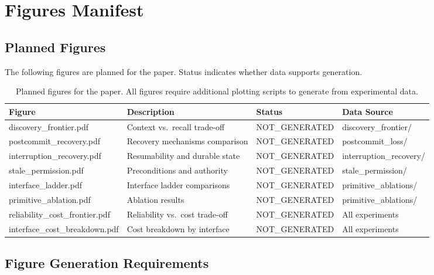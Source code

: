 
\section{Figures Manifest}

\subsection{Planned Figures}

The following figures are planned for the paper. Status indicates whether data supports generation.

\begin{table}[h]
\centering
\begin{tabular}{llll}
\hline
\textbf{Figure} & \textbf{Description} & \textbf{Status} & \textbf{Data Source} \\
\hline
discovery\_frontier.pdf & Context vs.\ recall trade-off & NOT\_GENERATED & discovery\_frontier/ \\
postcommit\_recovery.pdf & Recovery mechanisms comparison & NOT\_GENERATED & postcommit\_loss/ \\
interruption\_recovery.pdf & Resumability and durable state & NOT\_GENERATED & interruption\_recovery/ \\
stale\_permission.pdf & Preconditions and authority & NOT\_GENERATED & stale\_permission/ \\
interface\_ladder.pdf & Interface ladder comparisons & NOT\_GENERATED & primitive\_ablations/ \\
primitive\_ablation.pdf & Ablation results & NOT\_GENERATED & primitive\_ablations/ \\
reliability\_cost\_frontier.pdf & Reliability vs.\ cost trade-off & NOT\_GENERATED & All experiments \\
interface\_cost\_breakdown.pdf & Cost breakdown by interface & NOT\_GENERATED & All experiments \\
\hline
\end{tabular}
\caption{Planned figures for the paper. All figures require additional plotting scripts to generate from experimental data.}
\label{tab:figures_manifest}
\end{table}

\subsection{Figure Generation Requirements}

